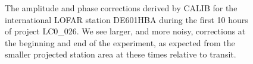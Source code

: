 \begin{figure}[htbp]
\centering
{}
\caption{
The amplitude and phase corrections derived by CALIB for the international
LOFAR station DE601HBA during the first 10 hours of project LC0\_026.  We see
larger, and more noisy, corrections at the beginning and end of the experiment,
as expected from the smaller projected station area at these times relative to
transit. 
\label{fig:ampcal}
}
\end{figure}
    
